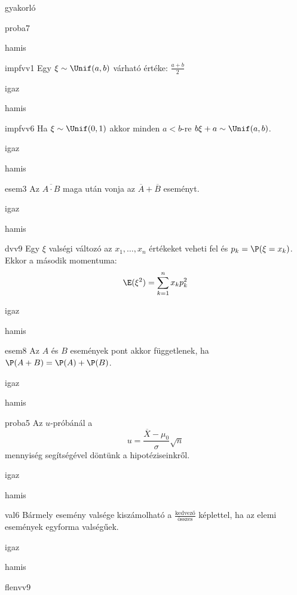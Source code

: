 \documentclass[12pt]{article}
\begin{document}
\begin{quiz}{gyakorló}
\begin{multi}[feedback={A fenti formula az $t$-próba ún. próbastatisztikája.}]{proba7}
\item* hamis
\end{multi}
\begin{multi}[feedback={wiki}]{impfvv1}
Egy $\xi\sim \Unif(a,b)$ várható értéke: $\frac{a+b}{2}$
\item* igaz
\item hamis
\end{multi}
\begin{multi}[feedback={$b\xi+a \sim \Unif(a,a+b)$}]{impfvv6}
Ha $\xi\sim \Unif(0,1)$ akkor  minden $a<b$-re $b\xi+a\sim \Unif(a,b)$.
\item igaz
\item* hamis
\end{multi}
\begin{multi}[feedback={de-Morgan azonosság}]{esem3}
Az $\overline{A\cdot B}$ maga után vonja az $\overline{A} + \overline{B}$ eseményt.
\item* igaz
\item hamis
\end{multi}
\begin{multi}[feedback={Def.}]{dvv9}
Egy $\xi$ valségi változó az $x_1,\ldots, x_n$ értékeket veheti fel és $p_k=\P(\xi=x_k)$. 
Ekkor a második momentuma:
$$
\E(\xi^2)=\sum_{k=1}^n x_k p_k^2
$$
\item igaz
\item* hamis
\end{multi}
\begin{multi}[feedback={Definíció.}]{esem8}
Az $A$ és $B$ események pont akkor függetlenek, ha $\P(A+B)=\P(A)+\P(B)$.
\item igaz
\item* hamis
\end{multi}
\begin{multi}[feedback={A fenti formula az $u$-próba ún. próbastatisztikája.}]{proba5}
Az $u$-próbánál a 
$$
u=\frac{\overline{X}-\mu_0}{\sigma}\sqrt{n}
$$
mennyiség segítségével döntünk a hipotéziseinkről.
\item* igaz
\item hamis
\end{multi}
\begin{multi}[feedback={Additívitás.}]{val6}
Bármely esemény valsége kiszámolható a $\frac{\text{kedvező}}{\text{összes}}$ képlettel, ha az elemi események 
egyforma valségűek.
\item* igaz
\item hamis
\end{multi}
\begin{multi}[feedback={Tulajdonság,tétel.}]{flenvv9}

\end{multi}
\end{quiz}
\end{document}
